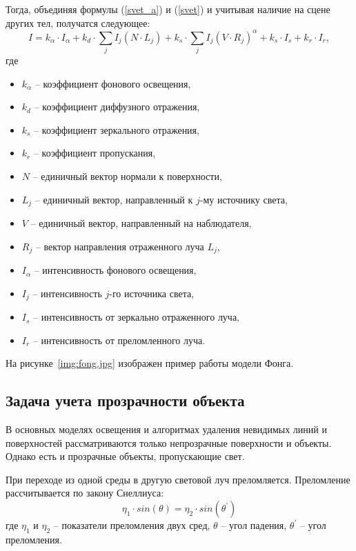 Тогда, объединяя формулы (\ref{svet_a}) и (\ref{svet}) и учитывая наличие на сцене других тел, получатся следующее:
\begin{equation}
	I = k_{\alpha}\cdot I_{\alpha} + k_d\cdot \sum_{j}I_j(N\cdot L_j) + k_s\cdot\sum_{j}I_j(V\cdot R_j)^{\alpha} + k_s\cdot I_s + k_r\cdot I_r,
\end{equation}
где 
\begin{itemize}
	\item $k_{\alpha}$ -- коэффициент фонового освещения,
	\item $k_d$ -- коэффициент диффузного отражения,
	\item $k_s$ -- коэффициент зеркального отражения,
	\item $k_r$ -- коэффициент пропускания,
	\item $N$ -- единичный вектор нормали к поверхности,
	\item $L_j$ -- единичный вектор, направленный к $j$-му источнику света,
	\item $V$ -- единичный вектор, направленный на наблюдателя,
	\item $R_j$ -- вектор направления отраженного луча $L_j$, 
	\item $I_{\alpha}$ -- интенсивность фонового освещения, 
	\item $I_j$ -- интенсивность $j$-го источника света, 
	\item $I_s$ -- интенсивность от зеркально отраженного луча, 
	\item $I_r$ -- интенсивность от преломленного луча.
\end{itemize}

На рисунке~\ref{img:fong.jpg} изображен пример работы модели Фонга.

\subsection{Задача учета прозрачности объекта}

В основных моделях освещения и алгоритмах удаления невидимых линий и поверхностей рассматриваются только непрозрачные поверхности и объекты. Однако есть и прозрачные объекты, пропускающие свет. 

При переходе из одной среды в другую световой луч преломляется. Преломление рассчитывается по закону Снеллиуса:
\begin{equation}
	\eta_{1}\cdot sin(\theta) = \eta_{2} \cdot sin(\theta^{'})
\end{equation}
где $\eta_{1}$ и $\eta_{2}$ -- показатели преломления двух сред, $\theta$ -- угол падения, $\theta^{'}$ -- угол преломления.

